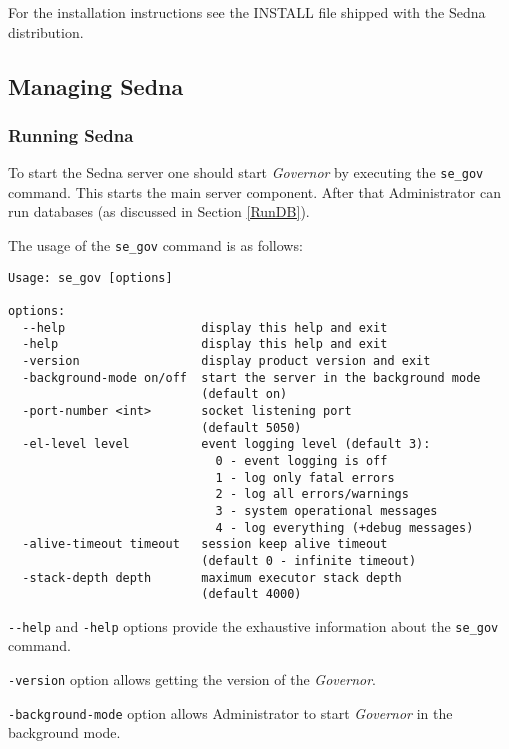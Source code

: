 \documentclass[a4paper,12pt]{article}
\begin{document}
For the installation instructions see the INSTALL file shipped with the
Sedna distribution.


\subsection{Managing Sedna}
\subsubsection{Running Sedna}
\label{StartSedna}

To start the Sedna server one should start \emph{Governor} by executing the
\verb!se_gov! command. This starts the main server component. After that
Administrator can run databases (as discussed in Section \ref{RunDB}).

The usage of the \verb!se_gov! command is as follows:

\small{
\begin{verbatim}
Usage: se_gov [options]

options:
  --help                   display this help and exit
  -help                    display this help and exit
  -version                 display product version and exit
  -background-mode on/off  start the server in the background mode
                           (default on)
  -port-number <int>       socket listening port
                           (default 5050)
  -el-level level          event logging level (default 3):
                             0 - event logging is off
                             1 - log only fatal errors
                             2 - log all errors/warnings
                             3 - system operational messages
                             4 - log everything (+debug messages)
  -alive-timeout timeout   session keep alive timeout
                           (default 0 - infinite timeout)
  -stack-depth depth       maximum executor stack depth
                           (default 4000)
\end{verbatim}}

\verb!--help! and \verb!-help! options provide the exhaustive information about
the \verb!se_gov! command.

\verb!-version! option allows getting the version of the \emph{Governor}.

\verb!-background-mode! option allows Administrator to start \emph{Governor} in
the background mode.
\end{document}

